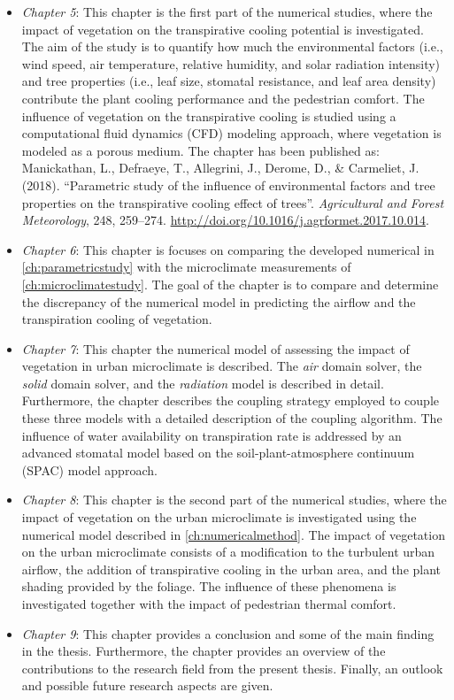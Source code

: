 \begin{itemize}
	\item \textit{Chapter 5}: This chapter is the first part of the numerical studies, where the impact of vegetation on the transpirative cooling potential is investigated. The aim of the study is to quantify how much the environmental factors (i.e., wind speed, air temperature, relative humidity, and solar radiation intensity) and tree properties (i.e., leaf size, stomatal resistance, and leaf area density) contribute the plant cooling performance and the pedestrian comfort. The influence of vegetation on the transpirative cooling is studied using a computational fluid dynamics (CFD) modeling approach, where vegetation is modeled as a porous medium. The chapter has been published as: Manickathan, L., Defraeye, T., Allegrini, J., Derome, D., \& Carmeliet, J. (2018). ``Parametric study of the influence of environmental factors and tree properties on the transpirative cooling effect of trees''. \textit{Agricultural and Forest Meteorology}, 248, 259–274. \url{http://doi.org/10.1016/j.agrformet.2017.10.014}.

	\item \textit{Chapter 6}: This chapter is focuses on comparing the developed numerical in \cref{ch:parametricstudy} with the microclimate measurements of \cref{ch:microclimatestudy}. The goal of the chapter is to compare and determine the discrepancy of the numerical model in predicting the airflow and the transpiration cooling of vegetation. 

	\item \textit{Chapter 7}: This chapter the numerical model of assessing the impact of vegetation in urban microclimate is described. The \textit{air} domain solver, the \textit{solid} domain solver, and the \textit{radiation} model is described in detail. Furthermore, the chapter describes the coupling strategy employed to couple these three models with a detailed description of the coupling algorithm. The influence of water availability on transpiration rate is addressed by an advanced stomatal model based on the soil-plant-atmosphere continuum (SPAC) model approach. 

	\item \textit{Chapter 8}: This chapter is the second part of the numerical studies, where the impact of vegetation on the urban microclimate is investigated using the numerical model described in \cref{ch:numericalmethod}. The impact of vegetation on the urban microclimate consists of a modification to the turbulent urban airflow, the addition of transpirative cooling in the urban area, and the plant shading provided by the foliage. The influence of these phenomena is investigated together with the impact of pedestrian thermal comfort. 

	\item \textit{Chapter 9}: This chapter provides a conclusion and some of the main finding in the thesis. Furthermore, the chapter provides an overview of the contributions to the research field from the present thesis. Finally, an outlook and possible future research aspects are given.


	
\end{itemize}

